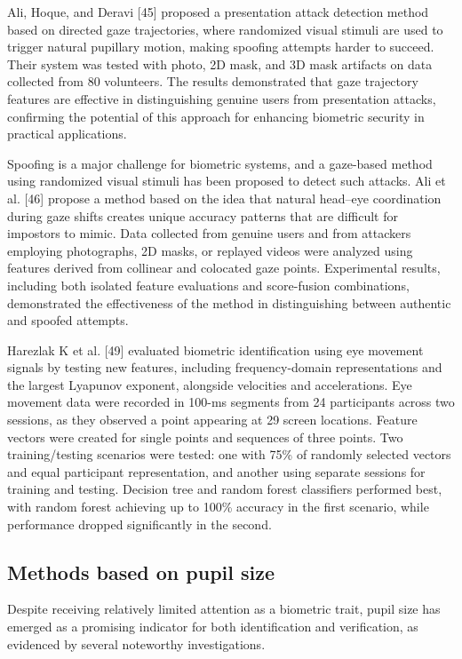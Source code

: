 \documentclass{article}
\begin{document}
Ali, Hoque, and Deravi [45] proposed a presentation attack detection method based on directed gaze trajectories, where randomized visual stimuli are used to trigger natural pupillary motion, making spoofing attempts harder to succeed. 
Their system was tested with photo, 2D mask, and 3D mask artifacts on data collected from 80 volunteers.
The results demonstrated that gaze trajectory features are effective in distinguishing genuine users from presentation attacks, confirming the potential of this approach for enhancing biometric security in practical applications.

Spoofing is a major challenge for biometric systems, and a gaze-based method using randomized visual stimuli has been proposed to detect such attacks.
Ali et al. [46] propose a method based on the idea that natural head–eye coordination during gaze shifts creates unique accuracy patterns that are difficult for impostors to mimic.
Data collected from genuine users and from attackers employing photographs, 2D masks, or replayed videos were analyzed using features derived from collinear and colocated gaze points. 
Experimental results, including both isolated feature evaluations and score-fusion combinations, demonstrated the effectiveness of the method in distinguishing between authentic and spoofed attempts.

Harezlak K et al. [49] evaluated biometric identification using eye movement signals by testing new features, including frequency-domain representations and the largest Lyapunov exponent, alongside velocities and accelerations.
Eye movement data were recorded in 100-ms segments from 24 participants across two sessions, as they observed a point appearing at 29 screen locations. 
Feature vectors were created for single points and sequences of three points. 
Two training/testing scenarios were tested: one with 75\% of randomly selected vectors and equal participant representation, and another using separate sessions for training and testing.
Decision tree and random forest classifiers performed best, with random forest achieving up to 100\% accuracy in the first scenario, while performance dropped significantly in the second.

\subsection{Methods based on pupil size}

Despite receiving relatively limited attention as a biometric trait, pupil size has emerged as a promising indicator for both identification and verification, as evidenced by several noteworthy investigations.
\end{document}
